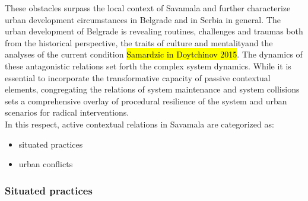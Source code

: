 \documentclass[11pt]{report}
\begin{document}
These obstacles surpass the local context of Savamala and further characterize urban development circumstances in Belgrade and in Serbia in general.
The  urban  development  of  Belgrade  is  revealing  routines, challenges  and  traumas both from the historical perspective, the traits of culture and mentality\footnotemark and the analyses of the current condition \hl{Samardzic in Doytchinov 2015}. 
The dynamics of these antagonistic relations set forth the complex system dynamics.
While it is essential to incorporate the transformative capacity of passive contextual elements, congregating the relations of system maintenance and system collisions sets a comprehensive overlay of procedural resilience of the system and urban scenarios for radical interventions.
\\
In this respect, active contextual relations in Savamala are categorized as:
\begin{itemize}
\item situated practices
\item urban conflicts
\end{itemize}

\subsubsection{Situated practices}
\end{document}
